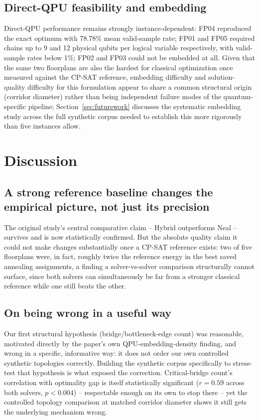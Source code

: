 \documentclass[11pt]{article}
\begin{document}
\subsection{Direct-QPU feasibility and embedding}
Direct-QPU performance remains strongly instance-dependent: FP04 reproduced the exact optimum with 78.78\% mean valid-sample rate; FP01 and FP05 required chains up to 9 and 12 physical qubits per logical variable respectively, with valid-sample rates below 1\%; FP02 and FP03 could not be embedded at all. Given that the same two floorplans are also the hardest for classical optimization once measured against the CP-SAT reference, embedding difficulty and solution-quality difficulty for this formulation appear to share a common structural origin (corridor diameter) rather than being independent failure modes of the quantum-specific pipeline; Section~\ref{sec:futurework} discusses the systematic embedding study across the full synthetic corpus needed to establish this more rigorously than five instances allow.

\section{Discussion}

\subsection{A strong reference baseline changes the empirical picture, not just its precision}
The original study's central comparative claim -- Hybrid outperforms Neal -- survives and is now statistically confirmed. But the absolute quality claim it could not make changes substantially once a CP-SAT reference exists: two of five floorplans were, in fact, roughly twice the reference energy in the best saved annealing assignments, a finding a solver-vs-solver comparison structurally cannot surface, since both solvers can simultaneously be far from a stronger classical reference while one still beats the other.

\subsection{On being wrong in a useful way}
Our first structural hypothesis (bridge/bottleneck-edge count) was reasonable, motivated directly by the paper's own QPU-embedding-density finding, and wrong in a specific, informative way: it does not order our own controlled synthetic topologies correctly. Building the synthetic corpus specifically to stress-test that hypothesis is what exposed the correction. Critical-bridge count's correlation with optimality gap is itself statistically significant ($r=0.59$ across both solvers, $p<0.004$) -- respectable enough on its own to stop there -- yet the controlled topology comparison at matched corridor diameter shows it still gets the underlying mechanism wrong.
\end{document}
